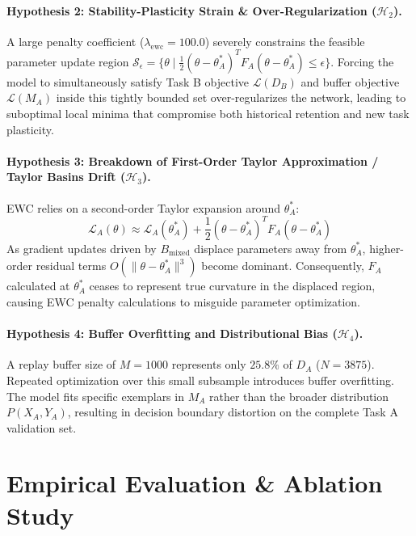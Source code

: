 \documentclass{article}
\begin{document}
\paragraph{Hypothesis 2: Stability-Plasticity Strain \& Over-Regularization ($\mathcal{H}_2$).}
A large penalty coefficient ($\lambda_{\text{ewc}} = 100.0$) severely constrains the feasible parameter update region $\mathcal{S}_{\epsilon} = \{\theta \mid \frac{1}{2} (\theta - \theta_A^*)^T F_A (\theta - \theta_A^*) \le \epsilon\}$. Forcing the model to simultaneously satisfy Task B objective $\mathcal{L}(D_B)$ and buffer objective $\mathcal{L}(M_A)$ inside this tightly bounded set over-regularizes the network, leading to suboptimal local minima that compromise both historical retention and new task plasticity.

\paragraph{Hypothesis 3: Breakdown of First-Order Taylor Approximation / Taylor Basins Drift ($\mathcal{H}_3$).}
EWC relies on a second-order Taylor expansion around $\theta_A^*$:
\begin{equation}
\mathcal{L}_A(\theta) \approx \mathcal{L}_A(\theta_A^*) + \frac{1}{2} (\theta - \theta_A^*)^T F_A (\theta - \theta_A^*)
\end{equation}
As gradient updates driven by $B_{\text{mixed}}$ displace parameters away from $\theta_A^*$, higher-order residual terms $O(\|\theta - \theta_A^*\|^3)$ become dominant. Consequently, $F_A$ calculated at $\theta_A^*$ ceases to represent true curvature in the displaced region, causing EWC penalty calculations to misguide parameter optimization.

\paragraph{Hypothesis 4: Buffer Overfitting and Distributional Bias ($\mathcal{H}_4$).}
A replay buffer size of $M = 1000$ represents only $25.8\%$ of $D_A$ ($N = 3875$). Repeated optimization over this small subsample introduces buffer overfitting. The model fits specific exemplars in $M_A$ rather than the broader distribution $P(X_A, Y_A)$, resulting in decision boundary distortion on the complete Task A validation set.

\section{Empirical Evaluation \& Ablation Study}
\end{document}
